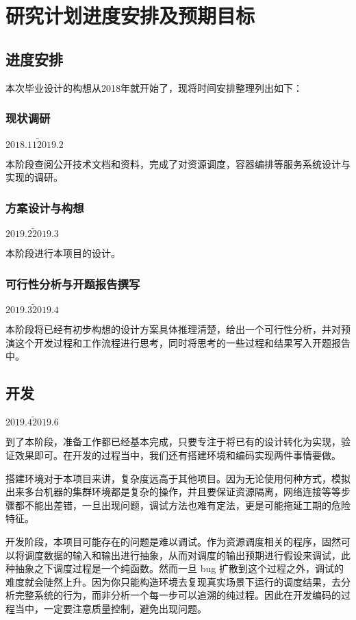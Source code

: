 \section{研究计划进度安排及预期目标}

\subsection{进度安排}

本次毕业设计的构想从2018年就开始了，现将时间安排整理列出如下：

\subsubsection*{现状调研}

$2018.11 \widetilde 2019.2$

本阶段查阅公开技术文档和资料，完成了对资源调度，容器编排等服务系统设计与实现的调研。

\subsubsection*{方案设计与构想}

$2019.2 \widetilde 2019.3$

本阶段进行本项目的设计。

\subsubsection*{可行性分析与开题报告撰写}

$2019.3 \widetilde 2019.4$

本阶段将已经有初步构想的设计方案具体推理清楚，给出一个可行性分析，并对预演这个开发过程和工作流程进行思考，同时将思考的一些过程和结果写入开题报告中。

\subsection*{开发}

$2019.4 \widetilde 2019.6$

到了本阶段，准备工作都已经基本完成，只要专注于将已有的设计转化为实现，验证效果即可。在开发的过程当中，我们还有搭建环境和编码实现两件事情要做。

搭建环境对于本项目来讲，复杂度远高于其他项目。因为无论使用何种方式，模拟出来多台机器的集群环境都是复杂的操作，并且要保证资源隔离，网络连接等等步骤都不能出差错，一旦出现问题，调试方法也难有定法，更是可能拖延工期的危险特征。

开发阶段，本项目可能存在的问题是难以调试。作为资源调度相关的程序，固然可以将调度数据的输入和输出进行抽象，从而对调度的输出预期进行假设来调试，此种抽象之下调度过程是一个纯函数。然而一旦 bug 扩散到这个过程之外，调试的难度就会陡然上升。因为你只能构造环境去复现真实场景下运行的调度结果，去分析完整系统的行为，而非分析一个每一步可以追溯的纯过程。因此在开发编码的过程当中，一定要注意质量控制，避免出现问题。

